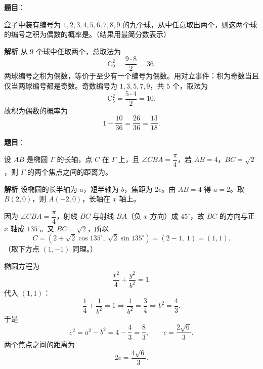 \begin{answer}

\textbf{题目}：

盒子中装有编号为 $1,2,3,4,5,6,7,8,9$ 的九个球，从中任意取出两个，则这两个球的编号之积为偶数的概率是\gkblank{}。（结果用最简分数表示）

\textbf{解析}
从 $9$ 个球中任取两个，总取法为
\nopagebreak[4]
\[\mathrm C_9^2=\frac{9\cdot8}{2}=36.\]
两球编号之积为偶数，等价于至少有一个编号为偶数。用对立事件：积为奇数当且仅当两球编号都是奇数。奇数编号为 $1,3,5,7,9$，共 $5$ 个，取法为
\nopagebreak[4]
\[\mathrm C_5^2=\frac{5\cdot4}{2}=10.\]
故积为偶数的概率为
\nopagebreak[4]
\[1-\frac{10}{36}=\frac{26}{36}=\frac{13}{18}.\]


\end{answer}
\begin{answer}

\textbf{题目}：

设 $AB$ 是椭圆 $\Gamma$ 的长轴，点 $C$ 在 $\Gamma$ 上，且 $\angle CBA=\dfrac{\pi}{4}$，若 $AB=4$，$BC=\sqrt2$，则 $\Gamma$ 的两个焦点之间的距离为\gkblank{}。

\textbf{解析}
设椭圆的长半轴为 $a$，短半轴为 $b$，焦距为 $2c$。由 $AB=4$ 得 $a=2$。取 $B(2,0)$，则 $A(-2,0)$，长轴在 $x$ 轴上。

因为 $\angle CBA=\dfrac\pi4$，射线 $BC$ 与射线 $BA$（负 $x$ 方向）成 $45^\circ$，故 $BC$ 的方向与正 $x$ 轴成 $135^\circ$。又 $BC=\sqrt2$，所以
\nopagebreak[4]
\[C=\left(2+\sqrt2\cos135^\circ,\ \sqrt2\sin135^\circ\right)
=\left(2-1,\ 1\right)=(1,1).\]
（取下方点 $(1,-1)$ 同理。）

椭圆方程为
\nopagebreak[4]
\[\frac{x^2}{4}+\frac{y^2}{b^2}=1.\]
代入 $(1,1)$：
\nopagebreak[4]
\[\frac14+\frac1{b^2}=1\Longrightarrow \frac1{b^2}=\frac34\Longrightarrow b^2=\frac43.\]
于是
\nopagebreak[4]
\[c^2=a^2-b^2=4-\frac43=\frac83,\qquad c=\frac{2\sqrt6}{3}.\]
两个焦点之间的距离为
\nopagebreak[4]
\[2c=\frac{4\sqrt6}{3}.\]


\end{answer}
